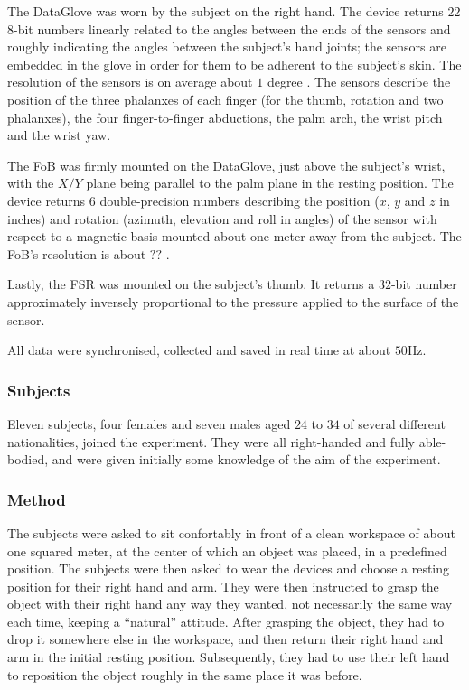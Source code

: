 The DataGlove was worn by the subject on the right hand. The device
returns $22$ $8$-bit numbers linearly related to the angles between
the ends of the sensors and roughly indicating the angles between the
subject's hand joints; the sensors are embedded in the glove in order
for them to be adherent to the subject's skin. The resolution of the
sensors is on average about $1$ degree \cite{dataglove_res}. The
sensors describe the position of the three phalanxes of each finger
(for the thumb, rotation and two phalanxes), the four finger-to-finger
abductions, the palm arch, the wrist pitch and the wrist yaw.

The FoB was firmly mounted on the DataGlove, just above the subject's
wrist, with the $X/Y$ plane being parallel to the palm plane in the
resting position. The device returns $6$ double-precision numbers
describing the position ($x$, $y$ and $z$ in inches) and rotation
(azimuth, elevation and roll in angles) of the sensor with respect to
a magnetic basis mounted about one meter away from the subject. The
FoB's resolution is about $??$ \cite{fob_res}.

Lastly, the FSR was mounted on the subject's thumb. It returns a
$32$-bit number approximately inversely proportional to the pressure
applied to the surface of the sensor.

All data were synchronised, collected and saved in real time at about
$50$Hz.

\subsubsection*{Subjects}

Eleven subjects, four females and seven males aged $24$ to $34$ of
several different nationalities, joined the experiment. They were all
right-handed and fully able-bodied, and were given initially some
knowledge of the aim of the experiment.

\subsubsection*{Method}

The subjects were asked to sit confortably in front of a clean
workspace of about one squared meter, at the center of which an object
was placed, in a predefined position. The subjects were then asked to
wear the devices and choose a resting position for their right hand
and arm. They were then instructed to grasp the object with their
right hand any way they wanted, not necessarily the same way each
time, keeping a ``natural'' attitude. After grasping the object, they
had to drop it somewhere else in the workspace, and then return their
right hand and arm in the initial resting position. Subsequently, they
had to use their left hand to reposition the object roughly in the
same place it was before.

